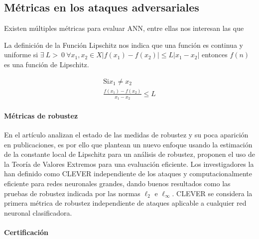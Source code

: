 

\subsection{Métricas en los ataques adversariales}





Existen múltiples métricas para evaluar \acrshort{ANN}, entre ellas nos interesan las que

La definición de la Función Lipschitz nos indica que una función es continua y uniforme si ${\exists~L >~0~\forall x_{1}, x_{2} \in X \left\lvert f(x_{1})-f(x_{2}) \right\rvert \leq L \left\lvert x_{1} - x_{2}\right\rvert}$ entonces ${f(n)}$ es una función de Lipschitz.

\begin{equation}
    \begin{split}
        \text{Si} x_{1} \neq x_{2}                              \\
        \frac{ f(x_{1}) - f(x_{2}) }{ x_{1} - x_{2} } \leq L
    \end{split}
\end{equation}

\paragraph{Métricas de robustez}

En el artículo \cite{weng2018evaluating} analizan el estado de las medidas de robustez y su poca aparición en publicaciones, es por ello que plantean un nuevo enfoque usando la estimación de la constante local de Lipschitz para un análisis de robustez, proponen el uso de la Teoría de Valores Extremos para una evaluación eficiente. Los investigadores la han definido como \gls{CLEVER} independiente de los ataques y computacionalmente eficiente para redes neuronales grandes, dando buenos resultados como las pruebas de robustez indicada por las normas ${\ell_{2}}$ e ${\ell_{\infty}}$. \gls{CLEVER} se considera la primera métrica de robustez independiente de ataques aplicable a cualquier red neuronal clasificadora.



\paragraph{Certificación}


